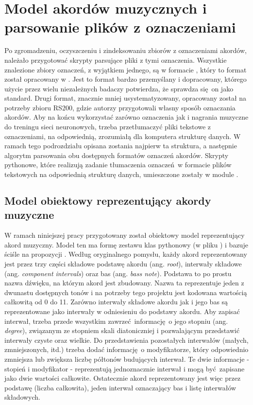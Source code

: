 \section{Model akordów muzycznych i parsowanie plików z oznaczeniami}

Po zgromadzeniu, oczyszczeniu i zindeksowaniu zbiorów z oznaczeniami akordów, należało przygotować
skrypty parsujące pliki z tymi oznaczenia. Wszystkie znalezione zbiory oznaczeń, z wyjątkiem
jednego, są w formacie , który to format został opracowany w \cite{harte_towards_nodate}.
Jest to format bardzo przemyślany i dopracowany, którego użycie przez wielu niezależnych badaczy
potwierdza, że sprawdza się on jako standard. Drugi format, znacznie mniej usystematyzowany,
opracowany został na potrzeby zbioru RS200, gdzie autorzy przygotowali własny sposób oznaczania
akordów. Aby na końcu wykorzystać zarówno oznaczenia jak i nagrania muzyczne do treningu sieci
neuronowych, trzeba przetłumaczyć pliki tekstowe z oznaczeniami, na odpowiednią, zrozumiałą dla
komputera strukturę danych. W ramach tego podrozdziału opisana zostania najpierw ta struktura, a
następnie algorytm parsowania obu dostępnych formatów oznaczeń akordów. Skrypty pythonowe, które
realizują zadanie tłumaczenia oznaczeń w formacie plików tekstowych na odpowiednią strukturę danych,
umieszczone zostały w module .

\subsection{Model obiektowy reprezentujący akordy muzyczne}

W ramach niniejszej pracy przygotowany został obiektowy model reprezentujący akord muzyczny. Model
ten ma formę zestawu klas pythonowy (w pliku ) i bazuje
ściśle na propozycji \cite{harte_towards_nodate}. Według oryginalnego pomysłu, każdy akord
reprezentowany jest przez trzy części składowe podstawę akordu (ang. \emph{root}), interwały
składowe (ang. \emph{component intervals}) oraz bas (ang. \emph{bass note}). Podstawa to po prostu
nazwa dźwięku, na którym akord jest zbudowany. Nazwa ta reprezentuje jeden z dwunastu dostępnych
tonów i na potrzeby tego projektu jest kodowana wartością całkowitą od 0 do 11. Zarówno interwały
składowe akordu jak i jego bas są reprezentowane jako interwały w odniesieniu do podstawy akordu.
Aby zapisać interwał, trzeba przede wszystkim zawrzeć informację o jego stopniu (ang.
\emph{degree}), związanym ze stopniem skali diatoniczniej i pozwalającym przedstawić interwały czyste oraz
wielkie. Do przedstawienia pozostałych interwałów (małych, zmniejszonych, itd.) trzeba dodać
informację o modyfikatorze, który odpowiednio zmniejsza lub zwiększa liczbę półtonów budujących
interwał. Te dwie informacje - stopień i modyfikator - reprezentują jednoznacznie interwał i mogą
być zapisane jako dwie wartości całkowite. Ostatecznie akord reprezentowany jest więc przez podstawę
(liczba całkowita), jeden interwał oznaczający bas i listę interwałów składowych.

